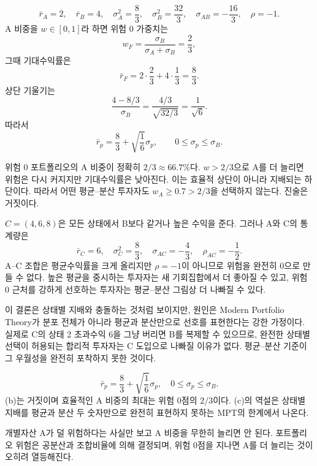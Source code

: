 \begin{solutionbox}
\[
\bar r_A=2,\quad\bar r_B=4,
\quad\sigma_A^2=\frac83,\quad\sigma_B^2=\frac{32}{3},
\quad\sigma_{AB}=-\frac{16}{3},\quad\rho=-1.
\]
A 비중을 $w\in[0,1]$라 하면 위험 0 가중치는
\[
w_F=\frac{\sigma_B}{\sigma_A+\sigma_B}=\frac23,
\]
그때 기대수익률은
\[
\bar r_F=2\cdot\frac23+4\cdot\frac13=\frac83.
\]
상단 기울기는
\[
\frac{4-8/3}{\sigma_B}=\frac{4/3}{\sqrt{32/3}}=\frac1{\sqrt6}.
\]
따라서
\[
\boxed{\bar r_p=\frac83+\sqrt{\frac16}\sigma_p,\qquad
0\le\sigma_p\le\sigma_B}.
\]

위험 0 포트폴리오의 A 비중이 정확히 $2/3\approx66.7\%$다. $w>2/3$으로 A를 더 늘리면 위험은 다시 커지지만 기대수익률은 낮아진다. 이는 효율적 상단이 아니라 지배되는 하단이다. 따라서 어떤 평균--분산 투자자도 $w_A\ge0.7>2/3$을 선택하지 않는다. 진술은 거짓이다.

$C=(4,6,8)$은 모든 상태에서 B보다 같거나 높은 수익을 준다. 그러나 A와 C의 통계량은
\[
\bar r_C=6,\quad\sigma_C^2=\frac83,
\quad\sigma_{AC}=-\frac43,\quad\rho_{AC}=-\frac12.
\]
A--C 조합은 평균수익률을 크게 올리지만 $\rho=-1$이 아니므로 위험을 완전히 0으로 만들 수 없다. 높은 평균을 중시하는 투자자는 새 기회집합에서 더 좋아질 수 있고, 위험 0 근처를 강하게 선호하는 투자자는 평균--분산 그림상 더 나빠질 수 있다.

이 결론은 상태별 지배와 충돌하는 것처럼 보이지만, 원인은 Modern Portfolio Theory가 분포 전체가 아니라 평균과 분산만으로 선호를 표현한다는 강한 가정이다. 실제로 C의 상태 2 초과수익 6을 그냥 버리면 B를 복제할 수 있으므로, 완전한 상태별 선택이 허용되는 합리적 투자자는 C 도입으로 나빠질 이유가 없다. 평균--분산 기준이 그 우월성을 완전히 포착하지 못한 것이다.
\end{solutionbox}

\begin{answerbox}
\[
\bar r_p=\frac83+\sqrt{\frac16}\sigma_p,\quad0\le\sigma_p\le\sigma_B.
\]
(b)는 거짓이며 효율적인 A 비중의 최대는 위험 0점의 $2/3$이다. (c)의 역설은 상태별 지배를 평균과 분산 두 숫자만으로 완전히 표현하지 못하는 MPT의 한계에서 나온다.
\end{answerbox}

\begin{warningbox}
개별자산 A가 덜 위험하다는 사실만 보고 A 비중을 무한히 늘리면 안 된다. 포트폴리오 위험은 공분산과 조합비율에 의해 결정되며, 위험 0점을 지나면 A를 더 늘리는 것이 오히려 열등해진다.
\end{warningbox}

